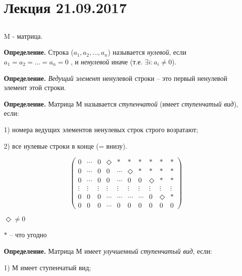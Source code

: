 \section{Лекция 21.09.2017}

\subsection{}
M - матрица.

\vspace{\baselineskip}
\textbf{Определение.} Строка ($a_1, a_2, \dots , a_n$) называется \textit{нулевой}, если $a_1 = a_2 = \dots = a_n = 0$ , и \textit{ненулевой} иначе (т.е. $\exists i: a_i \neq 0$).

\vspace{\baselineskip}
\textbf{Определение.} \textit{Ведущий элемент} ненулевой строки -- это первый ненулевой элемент этой строки.

\vspace{\baselineskip}
\textbf{Определение.} Матрица М называется \textit{ступенчатой} (имеет \textit{ступенчатый вид}), если:

1) номера ведущих элементов ненулевых строк строго возратают;

2) все нулевые строки в конце (= внизу).

\begin{equation*}
    \begin{pmatrix}
    	0 & \cdots & 0 & \Diamond & * & * & * & * & * & * \\
        0 & \cdots & 0 & 0 & \cdots & \Diamond & * & * & * & * \\
        0 & \cdots & 0 & 0 & \cdots & 0 & 0 & \Diamond & * & * \\
        \vdots & \vdots & \vdots& \vdots & \vdots & \vdots & \vdots & \vdots & \vdots& \vdots \\
        0 & 0 & 0 & \cdots & \cdots & \cdots & \cdots & 0 & \Diamond & *\\
        0 & 0 & 0 & \cdots & 0 & 0 & 0 & 0 & 0 & 0
	\end{pmatrix}
\end{equation*}

$\Diamond \neq 0$

$*$ -- что угодно

\vspace{\baselineskip}
\textbf{Определение.} Матрица М имеет \textit{улучшенный ступенчатый вид}, если:

1) М имеет ступенчатый вид;


